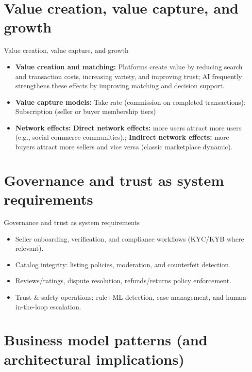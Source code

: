 \documentclass[aspectratio=169]{beamer}
\begin{document}
\section{Value creation, value capture, and growth}

\begin{frame}{Value creation, value capture, and growth}
  \begin{itemize}
    \item \textbf{Value creation and matching:} Platforms create value by reducing search and transaction costs, increasing variety, and improving trust; AI frequently strengthens these effects by improving matching and decision support.
    \item \textbf{Value capture models:} Take rate (commission on completed transactions); Subscription (seller or buyer membership tiers)
    \item \textbf{Network effects:} \textbf{Direct network effects:} more users attract more users (e.g., social commerce communities).; \textbf{Indirect network effects:} more buyers attract more sellers and vice versa (classic marketplace dynamic).
  \end{itemize}
\end{frame}

\section{Governance and trust as system requirements}

\begin{frame}{Governance and trust as system requirements}
  \begin{itemize}
    \item Seller onboarding, verification, and compliance workflows (KYC/KYB where relevant).
    \item Catalog integrity: listing policies, moderation, and counterfeit detection.
    \item Reviews/ratings, dispute resolution, refunds/returns policy enforcement.
    \item Trust \& safety operations: rule+ML detection, case management, and human-in-the-loop escalation.
  \end{itemize}
\end{frame}

\section{Business model patterns (and architectural implications)}
\end{document}
